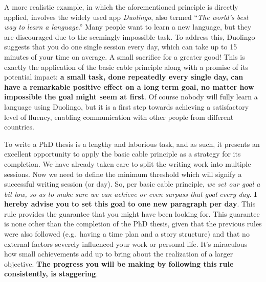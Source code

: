 \documentclass[
  12pt,
  oneside]{book}
\begin{document}
A more realistic example, in which the aforementioned principle is directly applied, involves the widely used app \emph{Duolingo}, also termed ``\emph{The world's best way to learn a language}.''
Many people want to learn a new language, but they are discouraged due to the seemingly impossible task.
To address this, Duolingo suggests that you do one single session every day, which can take up to 15 minutes of your time on average.
A small sacrifice for a greater good!
This is exactly the application of the basic cable principle along with a promise of its potential impact: \textbf{a small task, done repeatedly every single day, can have a remarkable positive effect on a long term goal, no matter how impossible the goal might seem at first}.
Of course nobody will fully learn a language using Duolingo, but it is a first step towards achieving a satisfactory level of fluency, enabling communication with other people from different countries.

To write a PhD thesis is a lengthy and laborious task, and as such, it presents an excellent opportunity to apply the basic cable principle as a strategy for its completion.
We have already taken care to split the writing work into multiple sessions.
Now we need to define the minimum threshold which will signify a successful writing session (or day).
So, per basic cable principle, \emph{we set our goal a bit low, so as to make sure we can achieve or even surpass that goal every day}.
\textbf{I hereby advise you to set this goal to one new paragraph per day}.
This rule provides the guarantee that you might have been looking for.
This guarantee is none other than the completion of the PhD thesis, given that the previous rules were also followed (e.g.~having a time plan and a story structure) and that no external factors severely influenced your work or personal life.
It's miraculous how small achievements add up to bring about the realization of a larger objective.
\textbf{The progress you will be making by following this rule consistently, is staggering}.
\end{document}
